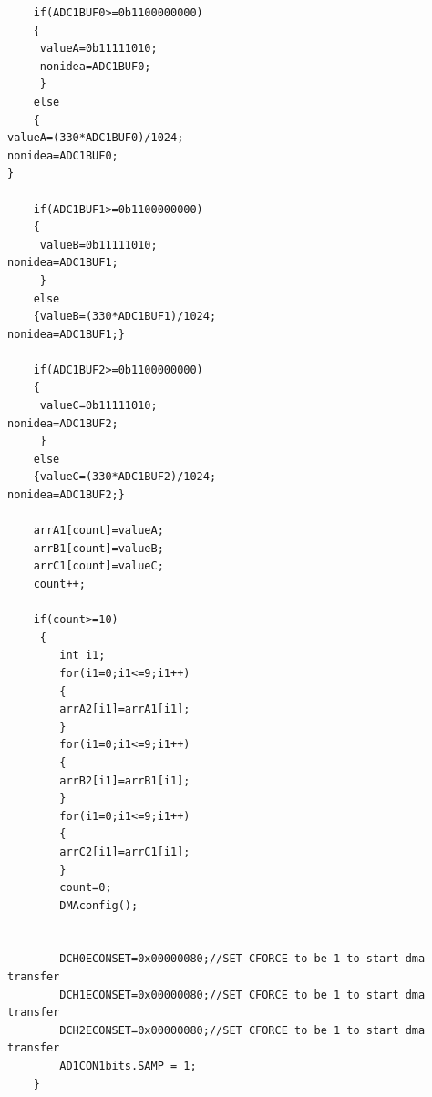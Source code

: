 \documentclass[12pt]{article}
\begin{document}
\begin{lstlisting}
    if(ADC1BUF0>=0b1100000000)
    {
     valueA=0b11111010;
     nonidea=ADC1BUF0;
     }
	else
    {
valueA=(330*ADC1BUF0)/1024;
nonidea=ADC1BUF0;
}
    
    if(ADC1BUF1>=0b1100000000)
    {
     valueB=0b11111010;
nonidea=ADC1BUF1;
     }
	else
    {valueB=(330*ADC1BUF1)/1024;
nonidea=ADC1BUF1;} 
 
    if(ADC1BUF2>=0b1100000000)
    {
     valueC=0b11111010;
nonidea=ADC1BUF2;
     }
	else
    {valueC=(330*ADC1BUF2)/1024;
nonidea=ADC1BUF2;}   

    arrA1[count]=valueA;
    arrB1[count]=valueB;
    arrC1[count]=valueC;
    count++;

	if(count>=10)
     {
		int i1;
		for(i1=0;i1<=9;i1++)
		{
		arrA2[i1]=arrA1[i1];
		}
		for(i1=0;i1<=9;i1++)
		{
		arrB2[i1]=arrB1[i1];
		}
		for(i1=0;i1<=9;i1++)
		{
		arrC2[i1]=arrC1[i1];
		}
		count=0;
		DMAconfig();

		
		DCH0ECONSET=0x00000080;//SET CFORCE to be 1 to start dma transfer
		DCH1ECONSET=0x00000080;//SET CFORCE to be 1 to start dma transfer
		DCH2ECONSET=0x00000080;//SET CFORCE to be 1 to start dma transfer
		AD1CON1bits.SAMP = 1;
    }
	

\end{lstlisting}
\end{document}
